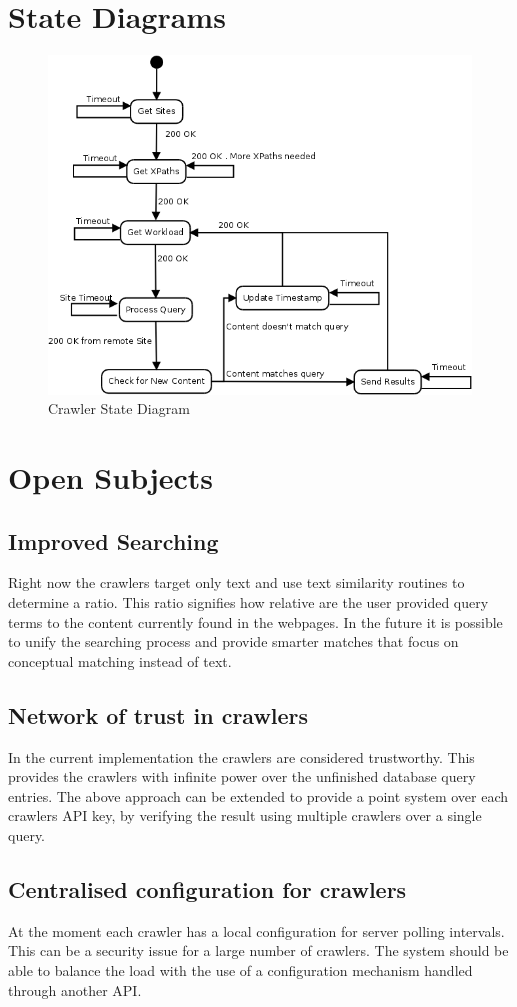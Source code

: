 \chapter{State Diagrams}
    \begin{figure}[h]
        \includegraphics[width=\textwidth]{files/state.jpg}
        \caption{Crawler State Diagram}
    \end{figure}

\chapter{Open Subjects}
    \section{Improved Searching}
        Right now the crawlers target only text and use text similarity
        routines to determine a ratio. This ratio signifies how relative are
        the user provided query terms to the content currently found in the
        webpages. In the future it is possible to unify the searching process
        and provide smarter matches that focus on conceptual matching instead
        of text.
    \section{Network of trust in crawlers}
        In the current implementation the crawlers are considered trustworthy.
        This provides the crawlers with infinite power over the unfinished
        database query entries. The above approach can be extended to provide
        a point system over each crawlers API key, by verifying the result
        using multiple crawlers over a single query.
    \section{Centralised configuration for crawlers}
        At the moment each crawler has a local configuration for server
        polling intervals. This can be a security issue for a large number of
        crawlers. The system should be able to balance the load with the use
        of a configuration mechanism handled through another API.

